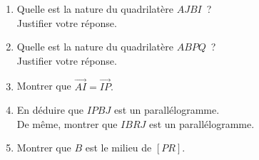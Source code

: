 \begin{enumerate}
\item
Quelle est la nature du quadrilatère $ AJBI $~?
\\
Justifier votre réponse.
\item
Quelle est la nature du quadrilatère $ ABPQ $~?
\\
Justifier votre réponse.
\item
Montrer que  $  \overrightarrow{ AI } =  \overrightarrow{ IP }. $
\item
En déduire que $ IPBJ $ est un parallélogramme.
\\
De même, montrer que  $ IBRJ $ est un parallélogramme.

\item
Montrer que $B$ est le milieu de $ [PR]. $
\end{enumerate}

